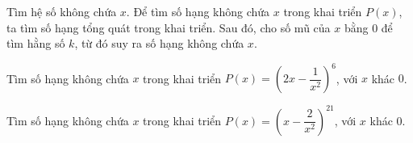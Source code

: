 \begin{dang}{Tìm hệ số không chứa $x$.} %
    Để tìm số hạng không chứa $x$ trong khai triển $P(x)$, ta tìm số hạng tổng quát trong khai triển. Sau đó, cho số mũ của $x$ bằng $0$ để tìm hằng số $k$, từ đó suy ra số hạng không chứa $x$. 
\end{dang}
\begin{vd}%
    Tìm số hạng không chứa $x$ trong khai triển $P(x) = \left(2x - \dfrac{1}{x^2}\right)^6$, với $x$ khác $0$. 
\end{vd}
\begin{vd}%
    Tìm số hạng không chứa $x$ trong khai triển $P(x) = \left(x - \dfrac{2}{x^2}\right)^{21}$, với $x$ khác $0$. 
\end{vd}
